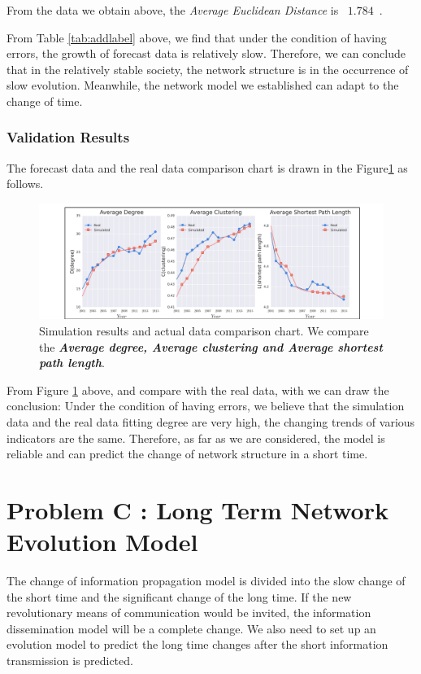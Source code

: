 \documentclass[a4paper,11pt]{article}
\begin{document}
\par From the data we obtain above, the \emph{Average Euclidean Distance} is ~$1.784$~. 
\par From Table \ref{tab:addlabel} above, we find that under the condition of having errors, the growth of forecast data is relatively slow. Therefore, we can conclude that in the relatively stable society, the network structure is in the occurrence of slow evolution. Meanwhile, the network model we established can adapt to the change of time.


\subsubsection{Validation Results}

\par The forecast data and the real data comparison chart is drawn in the Figure\ref{fig:P2} as follows.

\begin{figure}[h]%
    \centering 
    \includegraphics[width=1\textwidth]{./Pic/P2.jpg}
    \caption{Simulation results and actual data comparison chart. We compare the \textbf{\emph{Average degree, Average clustering and Average shortest path length}}.}
    \label{fig:P2}  
\end{figure}


\par From Figure \ref{fig:P2} above, and compare with the real data, with we can draw the conclusion: Under the condition of having errors, we believe that the simulation data and the real data fitting degree are very high, the changing trends of various indicators are the same. Therefore, as far as we are considered, the model is reliable and can predict the change of network structure in a short time.



\section{Problem C : Long Term Network Evolution Model}
\par The change of information propagation model is divided into the slow change of the short time and the significant change of the long time. If the new revolutionary means of communication would be invited, the information dissemination model will be a complete change. We also need to set up an evolution model to predict the long time changes after the short information transmission is predicted.
\end{document}
